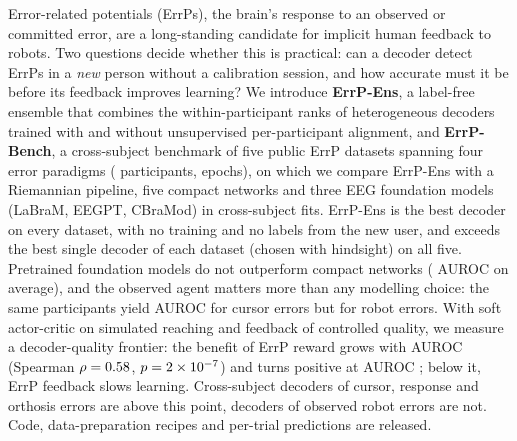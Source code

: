 Error-related potentials (ErrPs), the brain's response to an observed or committed error, are a long-standing
candidate for implicit human feedback to robots. Two questions decide whether this is practical: can a decoder
detect ErrPs in a \emph{new} person without a calibration session, and how accurate must it be before its
feedback improves learning? We introduce \textbf{ErrP-Ens}, a label-free ensemble that combines the
within-participant ranks of heterogeneous decoders trained with and without unsupervised per-participant
alignment, and \textbf{ErrP-Bench}, a cross-subject benchmark of five public ErrP datasets spanning four error
paradigms (\NSubjectsTotal{} participants, \NEpochsTotal{} epochs), on which we compare ErrP-Ens with a
Riemannian pipeline, five compact networks and three EEG foundation models (LaBraM, EEGPT, CBraMod) in
\NFitsTotal{} cross-subject fits. ErrP-Ens is the best decoder on every dataset, with no training and no labels
from the new user, and exceeds the best single decoder of each dataset (chosen with hindsight) on all five.
Pretrained foundation models do not outperform compact networks (\FMMinusCompactMean{} AUROC on average), and the
observed agent matters more than any modelling choice: the same participants yield \BestErrpHriCursor{} AUROC
for cursor errors but \BestErrpHriRobot{} for robot errors. With soft actor-critic on simulated reaching and
feedback of controlled quality, we measure a decoder-quality frontier: the benefit of ErrP reward grows with
AUROC (Spearman $\rho=0.58{}$, $p=2\times10^{-7}{}$) and turns positive at AUROC \RLBreakEvenReach{}; below
it, ErrP feedback slows learning. Cross-subject decoders of cursor, response and orthosis errors are above this
point, decoders of observed robot errors are not. Code, data-preparation recipes and per-trial predictions are
released.
